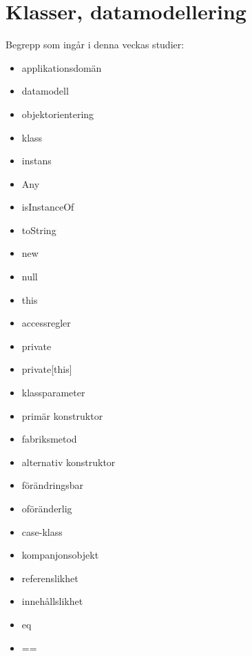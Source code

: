\chapter{Klasser, datamodellering}\label{chapter:W05}
Begrepp som ingår i denna veckas studier:
\begin{itemize}[noitemsep,label={$\square$},leftmargin=*]
\item applikationsdomän
\item datamodell
\item objektorientering
\item klass
\item instans
\item Any
\item isInstanceOf
\item toString
\item new
\item null
\item this
\item accessregler
\item private
\item private[this]
\item klassparameter
\item primär konstruktor
\item fabriksmetod
\item alternativ konstruktor
\item förändringsbar
\item oföränderlig
\item case-klass
\item kompanjonsobjekt
\item referenslikhet
\item innehållslikhet
\item eq
\item ==\end{itemize}
